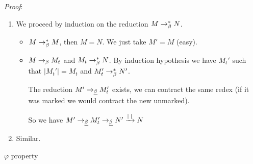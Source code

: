   \textit{Proof}:
    \begin{enumerate}
      \item We proceed by induction on the reduction $M \to_\beta^* N$.
        \begin{itemize}
          \item $M \to_\beta^* M$, then $M = N$. We just take $M' = M$ (easy).
          \item $M \to_\beta M_t$ and $M_t \to_\beta^* N$. By induction hypothesis we
            have $M_t'$ such that $|M_t'| = M_t $ and $M_t' \to_\beta^* N'$.

            The reduction $M' \to_{\underline \beta} M'_t$ exists, we can contract the same
            redex (if it was marked we would contract the new unmarked).

            So we have $M' \to_{\underline \beta} M'_t \to_{\underline \beta} N' \xrightarrow{|\;|} N$
        \end{itemize}
      \item Similar.
    \end{enumerate}
  \qedsymbol

  \lemma $\varphi$ property
    \label{lemm:phi}

